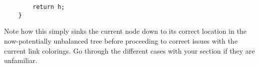 \begin{enumerate}
\begin{solution}
\begin{lstlisting}
        return h;
    }
\end{lstlisting}
Note how this simply sinks the current node down to its correct location in the now-potentially unbalanced tree before proceeding to correct issues with the current link colorings. Go through the different cases with your section if they are unfamiliar.
\end{solution}
\end{enumerate}
\clearpage